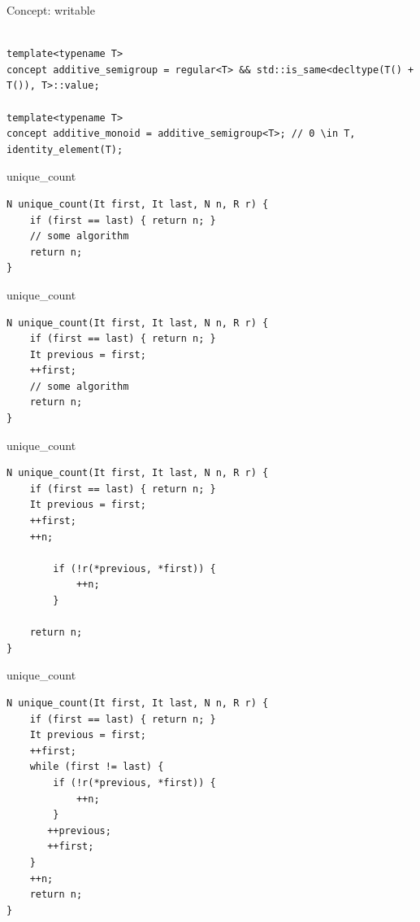 \documentclass[10pt]{beamer}
\begin{document}
\begin{frame}[fragile]{Concept: writable}
\begin{lstlisting}[style=cpp]

template<typename T>
concept additive_semigroup = regular<T> && std::is_same<decltype(T() + T()), T>::value; 

template<typename T>
concept additive_monoid = additive_semigroup<T>; // 0 \in T, identity_element(T);

\end{lstlisting}
\end{frame}

\begin{frame}[fragile]{unique\_count}
\begin{lstlisting}[style=cpp]
N unique_count(It first, It last, N n, R r) {
    if (first == last) { return n; }
    // some algorithm
    return n;
}

\end{lstlisting}
\end{frame}

\begin{frame}[fragile]{unique\_count}
\begin{lstlisting}[style=cpp]
N unique_count(It first, It last, N n, R r) {
    if (first == last) { return n; }
    It previous = first;
    ++first;
    // some algorithm
    return n;
}

\end{lstlisting}
\end{frame}

\begin{frame}[fragile]{unique\_count}
\begin{lstlisting}[style=cpp]
N unique_count(It first, It last, N n, R r) {
    if (first == last) { return n; }
    It previous = first;
    ++first;
    ++n;

        if (!r(*previous, *first)) {
            ++n;
        }
        
    return n;
}

\end{lstlisting}
\end{frame}


\begin{frame}[fragile]{unique\_count}
\begin{lstlisting}[style=cpp]
N unique_count(It first, It last, N n, R r) {
    if (first == last) { return n; }
    It previous = first;
    ++first;
    while (first != last) {
        if (!r(*previous, *first)) {
            ++n;
        }
       ++previous;
       ++first;
    }
    ++n;
    return n;
}

\end{lstlisting}
\end{frame}
\end{document}
